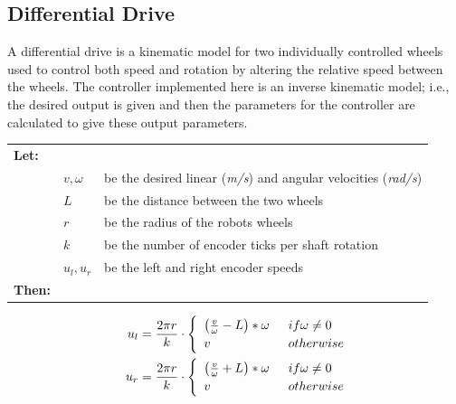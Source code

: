 \documentclass[11pt]{article}
\begin{document}
\subsection{Differential Drive}
A differential drive is a kinematic model for two individually controlled wheels
used to control both speed and rotation by altering the relative speed between
the wheels. The controller implemented here is an inverse kinematic model; i.e.,
the desired output is given and then the parameters for the controller are calculated to give these
output parameters. \par
{\footnotesize
  \begin{tabular}{l l l}
    \textbf{Let:} \\
 &$v, \omega$ & be the desired linear (\emph{m/s}) and angular velocities (\emph{rad/s})\\
 &$L$ &be the distance between the two wheels \\
 &$r$ &be the radius of the robots wheels \\
 &$k$ &be the number of encoder ticks per shaft rotation\\
    &$u_l, u_r$ &be the left and right encoder speeds \\
    \textbf{Then:}
  \end{tabular}
  \begin{align}
    u_l &=  \frac{2\pi r}{k} \cdot \begin{cases}
                    \hspace{5pt}\left(\frac{v}{\omega} - L \right) * \omega \hspace{5pt} & if \omega \neq 0\\
                    \hspace{5pt} v & otherwise
                  \end{cases} \vspace{5pt} \\
    u_r &=  \frac{2\pi r}{k} \cdot \begin{cases}
                    \hspace{5pt}\left(\frac{v}{\omega} + L \right) * \omega \hspace{5pt} & if \omega \neq 0\\
                    \hspace{5pt}v & otherwise
                  \end{cases} 
  \end{align}}
\end{document}
